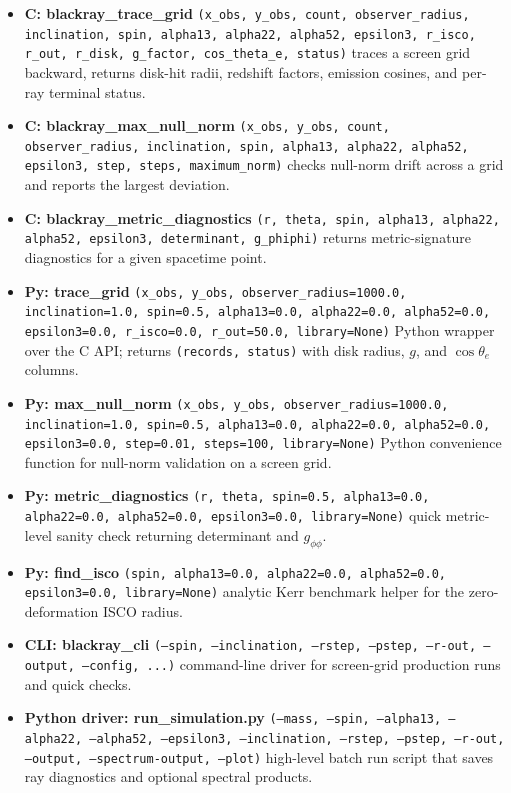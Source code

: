 \documentclass[11pt]{article}
\begin{document}
\begin{itemize}[leftmargin=1.5em]
    \item \textbf{C: blackray\_trace\_grid} \texttt{(x\_obs, y\_obs, count, observer\_radius, inclination, spin, alpha13, alpha22, alpha52, epsilon3, r\_isco, r\_out, r\_disk, g\_factor, cos\_theta\_e, status)} \textemdash{} traces a screen grid backward, returns disk-hit radii, redshift factors, emission cosines, and per-ray terminal status.
    \item \textbf{C: blackray\_max\_null\_norm} \texttt{(x\_obs, y\_obs, count, observer\_radius, inclination, spin, alpha13, alpha22, alpha52, epsilon3, step, steps, maximum\_norm)} \textemdash{} checks null-norm drift across a grid and reports the largest deviation.
    \item \textbf{C: blackray\_metric\_diagnostics} \texttt{(r, theta, spin, alpha13, alpha22, alpha52, epsilon3, determinant, g\_phiphi)} \textemdash{} returns metric-signature diagnostics for a given spacetime point.
    \item \textbf{Py: trace\_grid} \texttt{(x\_obs, y\_obs, observer\_radius=1000.0, inclination=1.0, spin=0.5, alpha13=0.0, alpha22=0.0, alpha52=0.0, epsilon3=0.0, r\_isco=0.0, r\_out=50.0, library=None)} \textemdash{} Python wrapper over the C API; returns \texttt{(records, status)} with disk radius, $g$, and $\cos\theta_{e}$ columns.
    \item \textbf{Py: max\_null\_norm} \texttt{(x\_obs, y\_obs, observer\_radius=1000.0, inclination=1.0, spin=0.5, alpha13=0.0, alpha22=0.0, alpha52=0.0, epsilon3=0.0, step=0.01, steps=100, library=None)} \textemdash{} Python convenience function for null-norm validation on a screen grid.
    \item \textbf{Py: metric\_diagnostics} \texttt{(r, theta, spin=0.5, alpha13=0.0, alpha22=0.0, alpha52=0.0, epsilon3=0.0, library=None)} \textemdash{} quick metric-level sanity check returning determinant and $g_{\phi\phi}$.
    \item \textbf{Py: find\_isco} \texttt{(spin, alpha13=0.0, alpha22=0.0, alpha52=0.0, epsilon3=0.0, library=None)} \textemdash{} analytic Kerr benchmark helper for the zero-deformation ISCO radius.
    \item \textbf{CLI: blackray\_cli} \texttt{(--spin, --inclination, --rstep, --pstep, --r-out, --output, --config, ...)} \textemdash{} command-line driver for screen-grid production runs and quick checks.
    \item \textbf{Python driver: run\_simulation.py} \texttt{(--mass, --spin, --alpha13, --alpha22, --alpha52, --epsilon3, --inclination, --rstep, --pstep, --r-out, --output, --spectrum-output, --plot)} \textemdash{} high-level batch run script that saves ray diagnostics and optional spectral products.

\end{itemize}
\end{document}
